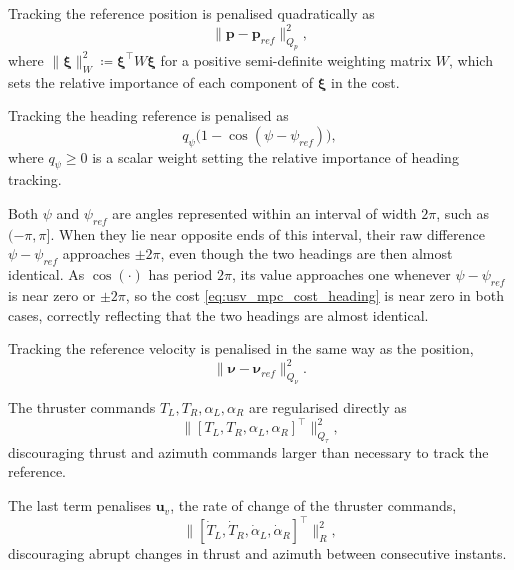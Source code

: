 Tracking the reference position is penalised quadratically as
\begin{equation}
    \|\mathbf{p}-\mathbf{p}_{ref}\|^2_{Q_p},
    \label{eq:usv_mpc_cost_pos}
\end{equation}
where $\|\boldsymbol\xi\|^2_W \coloneqq \boldsymbol\xi^\top W \boldsymbol\xi$ for a positive semi-definite weighting matrix $W$, which sets the relative importance of each component of $\boldsymbol\xi$ in the cost.

Tracking the heading reference is penalised as
\begin{equation}
    q_\psi\big(1-\cos(\psi-\psi_{ref})\big),
    \label{eq:usv_mpc_cost_heading}
\end{equation}
where $q_\psi \ge 0$ is a scalar weight setting the relative importance of heading tracking.

Both $\psi$ and $\psi_{ref}$ are angles represented within an interval of width $2\pi$, such as $(-\pi,\pi]$. When they lie near opposite ends of this interval, their raw difference $\psi-\psi_{ref}$ approaches $\pm2\pi$, even though the two headings are then almost identical. As $\cos(\cdot)$ has period $2\pi$, its value approaches one whenever $\psi-\psi_{ref}$ is near zero or $\pm2\pi$, so the cost \eqref{eq:usv_mpc_cost_heading} is near zero in both cases, correctly reflecting that the two headings are almost identical.

Tracking the reference velocity is penalised in the same way as the position,
\begin{equation}
    \|\boldsymbol{\nu}-\boldsymbol{\nu}_{ref}\|^2_{Q_\nu}.
    \label{eq:usv_mpc_cost_vel}
\end{equation}

The thruster commands $T_L, T_R, \alpha_L, \alpha_R$ are regularised directly as
\begin{equation}
    \big\|[T_L,T_R,\alpha_L,\alpha_R]^\top\big\|^2_{Q_\tau},
    \label{eq:usv_mpc_cost_reg}
\end{equation}
discouraging thrust and azimuth commands larger than necessary to track the reference.

The last term penalises $\mathbf{u}_v$, the rate of change of the thruster commands,
\begin{equation}
    \big\|[\dot{T}_L, \dot{T}_R, \dot{\alpha}_L, \dot{\alpha}_R]^\top\big\|^2_{R},
    \label{eq:usv_mpc_cost_rate}
\end{equation}
discouraging abrupt changes in thrust and azimuth between consecutive instants.

